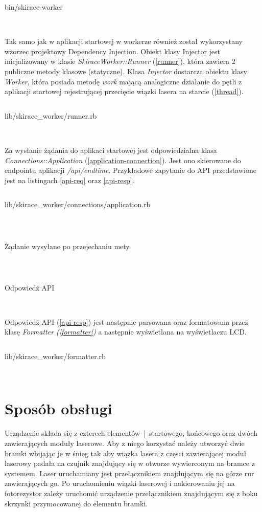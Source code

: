 \documentclass[11pt,a4paper, twoside]{article}
\begin{document}
\begin{listing}
\inputminted[linenos=true]{ruby}{./src/binary}
\caption{bin/skirace-worker}
$\label{binary}$
\end{listing}

Tak samo jak w aplikacji startowej w workerze również został wykorzystany wzorzec projektowy Dependency Injection. Obiekt klasy Injector jest inicjalizowany w klasie \emph{SkiraceWorker::Runner} (\ref{runner}), która zawiera 2 publiczne metody klasowe (statyczne). Klasa \emph{Injector} dostarcza obiektu klasy \emph{Worker}, która posiada metodę \emph{work} mającą analogiczne działanie do pętli z aplikacji startowej rejestrującej przecięcie wiązki lasera na starcie (\ref{thread}).

\begin{listing}
\inputminted[linenos=true]{ruby}{./src/runner.rb}
\caption{lib/skirace\_worker/runner.rb}
$\label{runner}$
\end{listing}

Za wysłanie żądania do aplikaci startowej jest odpowiedzialna klasa \emph{Connections::Application} (\ref{application-connection}). Jest ono skierowane do endpointu aplikacji \emph{/api/endtime}. Przykładowe zapytanie do API przedstawione jest na listingach \ref{api-req} oraz \ref{api-resp}.

\begin{listing}[H]
\inputminted[linenos=true]{ruby}{./src/app-conn.rb}
\caption{lib/skirace\_worker/connections/application.rb}
$\label{application-connection}$
\end{listing}

\begin{listing}[H]
\inputminted{ruby}{./src/api-req}
\caption{Żądanie wysyłane po przejechaniu mety}
$\label{api-req}$
\end{listing}

\begin{listing}[H]
\inputminted{json}{./src/api-resp}
\caption{Odpowiedź API}
$\label{api-resp}$
\end{listing}

Odpowiedź API (\ref{api-resp}) jest następnie parsowana oraz formatowana przez klasę \emph{Formatter (\ref{formatter})} a następnie wyświetlana na wyświetlaczu LCD.

\begin{listing}
\inputminted[linenos=true]{ruby}{./src/formatter.rb}
\caption{lib/skirace\_worker/formatter.rb}
$\label{formatter}$
\end{listing}
\section{Sposób obsługi}
Urządzenie składa się z czterech elementów~|~startowego, końcowego oraz dwóch zawierających moduły laserowe. Aby z niego korzystać należy utworzyć dwie bramki wbijając je w śnieg tak aby wiązka lasera z częsci zawierającej moduł laserowy padała na czujnik znajdujący się w otworze wywierconym na bramce z systemem. Laser uruchamiany jest przełącznikiem znajdującym się na górze rur zawierających go. Po uruchomieniu wiązki laserowej i nakierowaniu jej na fotorezystor zależy uruchomić urządzenie przełącznikiem znajdującym się z boku skrzynki przymocowanej do elementu bramki.
\end{document}
